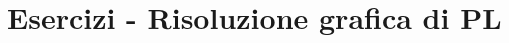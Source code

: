 \documentclass[\main/main.tex]{subfiles}
\begin{document}
\section{Esercizi - Risoluzione grafica di PL}





\end{document}
